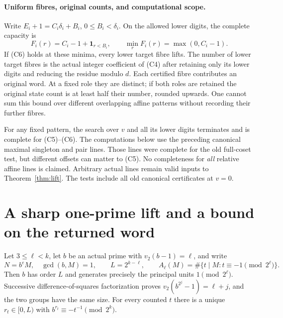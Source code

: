 \paragraph{Uniform fibres, original counts, and computational scope.}
Write $E_i+1=C_i\delta_i+B_i$, $0\le B_i<\delta_i$. On the allowed lower
digits, the complete capacity is
\[
 F_i(r)=C_i-1+\mathbf1_{r<B_i},\qquad
 \min_rF_i(r)=\max(0,C_i-1).                               \tag{C8}
\]
If (C6) holds at these minima, every lower target fibre lifts. The number of
lower target fibres is the actual integer coefficient of (C4) after retaining
only its lower digits and reducing the residue modulo $d$. Each certified
fibre contributes an original word. At a fixed role they are distinct; if both
roles are retained the original state count is at least half their number,
rounded upwards. One cannot sum this bound over different overlapping affine
patterns without recording their further fibres.

For any fixed pattern, the search over $v$ and all its lower digits terminates
and is complete for (C5)--(C6). The computations below use the preceding
canonical maximal singleton and pair lines. Those lines were complete for the
old full-coset test, but different offsets can matter to (C5). No completeness
for \emph{all} relative affine lines is claimed. Arbitrary actual lines remain
valid inputs to Theorem~\ref{thm:lift}. The tests include all old canonical
certificates at $v=0$.

\section{A sharp one-prime lift and a bound on the returned word}
Let $3\le\ell<k$, let $b$ be an actual prime with $v_2(b-1)=\ell$, and write
\[
 N=b^eM,\quad \gcd(b,M)=1,\qquad L=2^{k-\ell},\qquad
 A_\ell(M)=\#\{t\mid M:t\equiv-1\pmod{2^\ell}\}.            \tag{D1}
\]
Then $b$ has order $L$ and generates precisely the principal units
$1\pmod{2^\ell}$. Successive difference-of-squares factorization proves
$v_2(b^{2^j}-1)=\ell+j$, and the two groups have the same size.
For every counted $t$ there is a unique $r_t\in[0,L)$ with
$b^{r_t}\equiv-t^{-1}\pmod{2^k}$.

